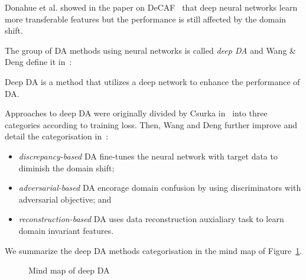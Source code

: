 Donahue et al. showed in the paper on DeCAF~\cite{donahue2014}
that deep neural networks learn more transferable features
but the performance is still affected by the domain shift.


The group of DA methods using neural networks is called \textit{deep DA}
and Wang \& Deng define it in~\cite{wang2018}:

\begin{definition}
	Deep DA is a method that utilizes a deep network to enhance the performance of DA.
\end{definition}

Approaches to deep DA were originally divided by Csurka in~\cite{csurka2017}
into three categories according to training loss.
Then, Wang and Deng further improve and detail the categorisation in~\cite{wang2018}:

\begin{itemize}
	\item \textit{discrepancy-based} DA fine-tunes the neural network
		with target data to diminish the domain shift;
	\item \textit{adversarial-based} DA encorage domain confusion
		by using discriminators with adversarial objective; and
	\item \textit{reconstruction-based} DA uses data reconstruction auxialiary task to learn domain invariant features.
\end{itemize}

We summarize the deep DA methods categorisation in the mind map of Figure~\ref{mind_map}.

\begin{figure}
	\caption{Mind map of deep DA}
	\label{mind_map}
\end{figure}

